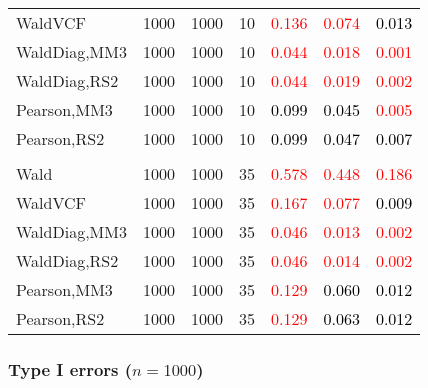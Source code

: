 \documentclass[
]{article}
\begin{document}
\begin{table}[H]
{\begin{tabular}[t]{lrrrrrr}
\hspace{1em}WaldVCF & 1000 & 1000 & 10 & \textcolor{red}{0.136} & \textcolor{red}{0.074} & \textcolor{black}{0.013}\\
\hspace{1em}WaldDiag,MM3 & 1000 & 1000 & 10 & \textcolor{red}{0.044} & \textcolor{red}{0.018} & \textcolor{red}{0.001}\\
\hspace{1em}WaldDiag,RS2 & 1000 & 1000 & 10 & \textcolor{red}{0.044} & \textcolor{red}{0.019} & \textcolor{red}{0.002}\\
\hspace{1em}Pearson,MM3 & 1000 & 1000 & 10 & \textcolor{black}{0.099} & \textcolor{black}{0.045} & \textcolor{red}{0.005}\\
\hspace{1em}Pearson,RS2 & 1000 & 1000 & 10 & \textcolor{black}{0.099} & \textcolor{black}{0.047} & \textcolor{black}{0.007}\\
\addlinespace[0.3em]
\multicolumn{7}{l}{\textbf{3F 15V}}\\
\hspace{1em}Wald & 1000 & 1000 & 35 & \textcolor{red}{0.578} & \textcolor{red}{0.448} & \textcolor{red}{0.186}\\
\hspace{1em}WaldVCF & 1000 & 1000 & 35 & \textcolor{red}{0.167} & \textcolor{red}{0.077} & \textcolor{black}{0.009}\\
\hspace{1em}WaldDiag,MM3 & 1000 & 1000 & 35 & \textcolor{red}{0.046} & \textcolor{red}{0.013} & \textcolor{red}{0.002}\\
\hspace{1em}WaldDiag,RS2 & 1000 & 1000 & 35 & \textcolor{red}{0.046} & \textcolor{red}{0.014} & \textcolor{red}{0.002}\\
\hspace{1em}Pearson,MM3 & 1000 & 1000 & 35 & \textcolor{red}{0.129} & \textcolor{black}{0.060} & \textcolor{black}{0.012}\\
\hspace{1em}Pearson,RS2 & 1000 & 1000 & 35 & \textcolor{red}{0.129} & \textcolor{black}{0.063} & \textcolor{black}{0.012}\\
\bottomrule
\end{tabular}}
\endgroup{}
\end{table}

\hypertarget{type-i-errors-n1000-3}{%
\subsubsection{\texorpdfstring{Type I errors
(\(n=1000\))}{Type I errors (n=1000)}}\label{type-i-errors-n1000-3}}
\end{document}
